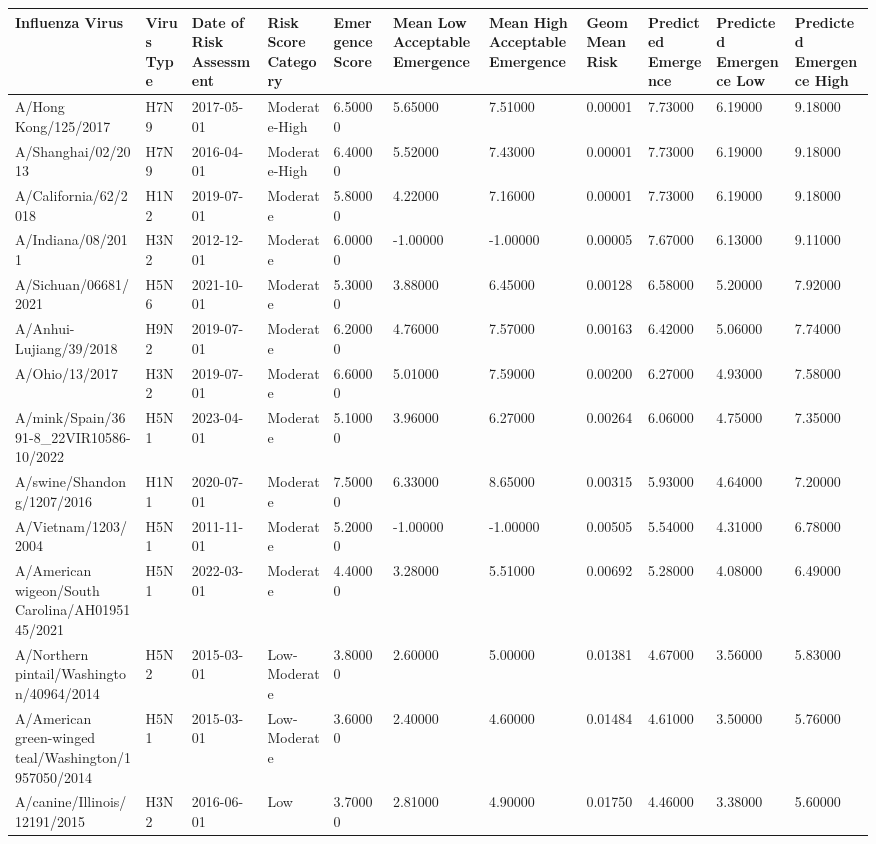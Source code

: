 \begin{tabular}{L{1in}|L{1in}|L{1in}|L{1in}|L{1in}|L{1in}|L{1in}|L{1in}|L{1in}|L{1in}|L{1in}}\hline
 Influenza  Virus & Virus  Type & Date  of  Risk  Assessment & Risk  Score  Category & Emergence  Score & Mean  Low  Acceptable  Emergence & Mean  High  Acceptable  Emergence & Geom  Mean  Risk & Predicted  Emergence & Predicted  Emergence  Low & Predicted  Emergence  High \\\hline
 A/Hong  Kong/125/2017 &H7N9&2017-05-01& Moderate-High &6.50000&5.65000&7.51000&0.00001&7.73000&6.19000&9.18000\\\hline
 A/Shanghai/02/2013 &H7N9&2016-04-01& Moderate-High &6.40000&5.52000&7.43000&0.00001&7.73000&6.19000&9.18000\\\hline
 A/California/62/2018 &H1N2&2019-07-01& Moderate &5.80000&4.22000&7.16000&0.00001&7.73000&6.19000&9.18000\\\hline
 A/Indiana/08/2011 &H3N2&2012-12-01& Moderate &6.00000&-1.00000&-1.00000&0.00005&7.67000&6.13000&9.11000\\\hline
 A/Sichuan/06681/2021 &H5N6&2021-10-01& Moderate &5.30000&3.88000&6.45000&0.00128&6.58000&5.20000&7.92000\\\hline
 A/Anhui-Lujiang/39/2018 &H9N2&2019-07-01& Moderate &6.20000&4.76000&7.57000&0.00163&6.42000&5.06000&7.74000\\\hline
 A/Ohio/13/2017 &H3N2&2019-07-01& Moderate &6.60000&5.01000&7.59000&0.00200&6.27000&4.93000&7.58000\\\hline
 A/mink/Spain/3691-8\_22VIR10586-10/2022 &H5N1&2023-04-01& Moderate &5.10000&3.96000&6.27000&0.00264&6.06000&4.75000&7.35000\\\hline
 A/swine/Shandong/1207/2016 &H1N1&2020-07-01& Moderate &7.50000&6.33000&8.65000&0.00315&5.93000&4.64000&7.20000\\\hline
 A/Vietnam/1203/2004 &H5N1&2011-11-01& Moderate &5.20000&-1.00000&-1.00000&0.00505&5.54000&4.31000&6.78000\\\hline
 A/American  wigeon/South  Carolina/AH0195145/2021 &H5N1&2022-03-01& Moderate &4.40000&3.28000&5.51000&0.00692&5.28000&4.08000&6.49000\\\hline
 A/Northern  pintail/Washington/40964/2014 &H5N2&2015-03-01& Low-Moderate &3.80000&2.60000&5.00000&0.01381&4.67000&3.56000&5.83000\\\hline
 A/American  green-winged  teal/Washington/1957050/2014 &H5N1&2015-03-01& Low-Moderate &3.60000&2.40000&4.60000&0.01484&4.61000&3.50000&5.76000\\\hline
 A/canine/Illinois/12191/2015 &H3N2&2016-06-01&Low&3.70000&2.81000&4.90000&0.01750&4.46000&3.38000&5.60000\\\hline

\end{tabular}
